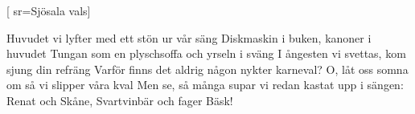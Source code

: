 


[ 	%
	sr={Sjösala vals}]		%
	
\beginverse*		%
Huvudet vi lyfter med ett stön ur vår säng
Diskmaskin i buken, kanoner i huvudet
Tungan som en plyschsoffa och yrseln i sväng
I ångesten vi svettas, kom sjung din refräng
Varför finns det aldrig någon nykter karneval?
O, låt oss somna om så vi slipper våra kval
Men se, så många supar vi redan kastat upp i sängen:
Renat och Skåne, Svartvinbär och fager Bäsk!
\endverse			%
\endsong			%
